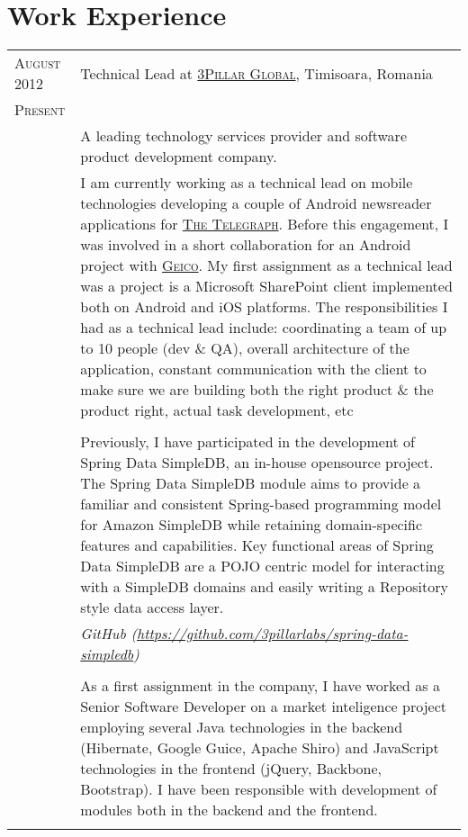 \documentclass[a4paper,10pt]{article}
\begin{document}
\section{Work Experience}
\begin{longtable}{p{2.5cm}|p{11cm}}

 \raggedleft \textsc{August 2012} & Technical Lead at
 \textsc{\href{http://www.3pillarglobal.com/}{3Pillar Global}}, Timisoara, Romania
 \\\raggedleft \textsc{Present}\\& 
 \footnotesize{A leading technology services provider and software product development company.}\\
& \footnotesize{I am currently working as a technical lead on mobile technologies developing a couple of Android newsreader applications for \textsc{\href{http://www.telegraph.co.uk/}{The Telegraph}}. Before this engagement, I was involved in a short collaboration for an Android project with \textsc{\href{https://www.geico.com/}{Geico}}. My first assignment as a technical lead was a project is a Microsoft SharePoint client implemented both on Android and iOS platforms. The responsibilities I had as a technical lead include: coordinating a team of up to 10 people (dev \& QA), overall architecture of the application, constant communication with the client to make sure we are building both the right product \& the product right, actual task development, etc} \\ \\
& \footnotesize{Previously, I have participated in the development of Spring Data SimpleDB, an in-house opensource project. The Spring Data SimpleDB module aims to provide a familiar and consistent Spring-based programming model for Amazon SimpleDB while retaining domain-specific features and capabilities. Key functional areas of Spring Data SimpleDB are a POJO centric model for interacting with a SimpleDB domains and easily writing a Repository style data access layer.} \\
& \footnotesize{\emph{GitHub (\url{https://github.com/3pillarlabs/spring-data-simpledb})}} \\ \\
& \footnotesize{As a first assignment in the company, I have worked as a Senior Software Developer on a market inteligence project employing several Java technologies in the backend (Hibernate, Google Guice, Apache Shiro) and JavaScript technologies in the
frontend (jQuery, Backbone, Bootstrap). I have been responsible with development of modules both in the backend and the frontend.}\\
\multicolumn{2}{c}{} \\ 


\end{longtable}
\end{document}
